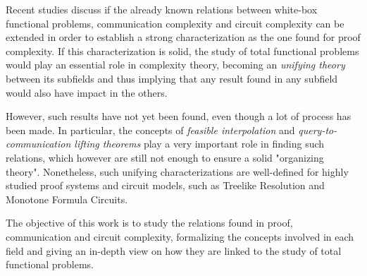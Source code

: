 Recent studies discuss if the already known relations between white-box functional problems, communication complexity and circuit complexity can be extended in order to establish a strong characterization as the one found for proof complexity. If this characterization is solid, the study of total functional problems would play an essential role in complexity theory, becoming an \textit{unifying theory} between its subfields and thus implying that any result found in any subfield would also have impact in the others.

However, such results have not yet been found, even though a lot of process has been made. In particular, the concepts of \textit{feasible interpolation} and \textit{query-to-communication lifting theorems} play a very important role in finding such relations, which however are still not enough to ensure a solid "organizing theory". Nonetheless, such unifying characterizations are well-defined for highly studied proof systems and circuit models, such as Treelike Resolution and Monotone Formula Circuits.

The objective of this work is to study the relations found in proof, communication and circuit complexity, formalizing the concepts involved in each field and giving an in-depth view on how they are linked to the study of total functional problems.

\cleardoublepage